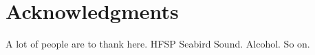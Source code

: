 \documentclass[a4paper,12pt]{article}
\begin{document}
{\section*{Acknowledgments}

A lot of people are to thank here. HFSP Seabird Sound. Alcohol. So on. 


\newpage




%
%
%
%
%
%
%
%
%
}
\end{document}
